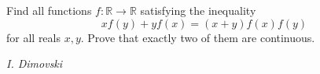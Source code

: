 Find all functions $f:\mathbb R\to\mathbb R$ satisfying the inequality
$$xf(y)+yf(x)=(x+y)f(x)f(y)$$for all reals $x,y$. Prove that exactly two of them are continuous.

\textit{I. Dimovski}